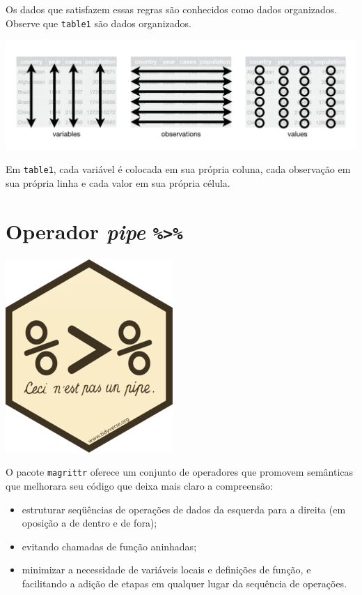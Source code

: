 \documentclass[]{book}
\providecommand{\tightlist}{%
  \setlength{\itemsep}{0pt}\setlength{\parskip}{0pt}}
\begin{document}
Os dados que satisfazem essas regras são conhecidos como dados organizados. Observe que \texttt{table1} são dados organizados.

\begin{center}\includegraphics[width=0.9\linewidth]{imagens/tidy-1} \end{center}

Em \texttt{table1}, cada variável é colocada em sua própria coluna, cada observação em sua própria linha e cada valor em sua própria célula.

\hypertarget{operador-pipe}{%
\section{\texorpdfstring{Operador \emph{pipe} \texttt{\%\textgreater{}\%}}{Operador pipe \%\textgreater{}\%}}\label{operador-pipe}}

\begin{center}\includegraphics[width=0.25\linewidth]{imagens/magritt} \end{center}

O pacote \texttt{magrittr} oferece um conjunto de operadores que promovem semânticas que melhorara seu código que deixa mais claro a compreensão:

\begin{itemize}
\tightlist
\item
  estruturar seqüências de operações de dados da esquerda para a direita (em oposição a de dentro e de fora);
\item
  evitando chamadas de função aninhadas;
\item
  minimizar a necessidade de variáveis locais e definições de função, e
  facilitando a adição de etapas em qualquer lugar da sequência de operações.
\end{itemize}
\end{document}
